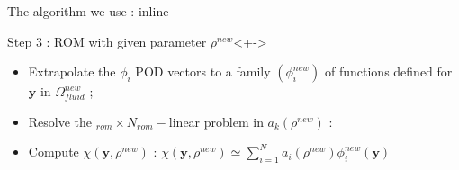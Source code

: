 \begin{frame}{The algorithm we use : inline}
%
\begin{block}{Step 3 : ROM with given parameter $\rho^{new}$}<+->
\begin{itemize}
\item<+-> Extrapolate the $\phi_i$ POD vectors to a family $(\phi_i^{new})$ of functions defined for $\mathbf{y}$ in $\Omega_{fluid}^{new}$ ;
\item<+-> Resolve the $_{rom}\times N_{rom}-$linear problem in $a_k(\rho^{new})$ :
\end{itemize}
\begin{itemize}
\item<+-> Compute $\chi(\mathbf{y},\rho^{new})$ : $\chi\left(\mathbf{y},\rho^{new}\right)\simeq \sum\limits_{i=1}^N a_i \left(\rho^{new}\right)\phi_i^{new}(\mathbf{y})$
\end{itemize}
\end{block}
%
\end{frame}
